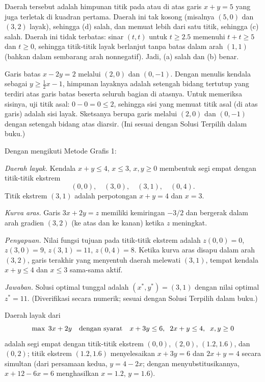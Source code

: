 Daerah tersebut adalah himpunan titik pada atau di atas garis $x + y = 5$ yang juga terletak di kuadran pertama. Daerah ini tak kosong (misalnya $(5,0)$ dan $(3,2)$ layak), sehingga (d) salah, dan memuat lebih dari satu titik, sehingga (c) salah. Daerah ini tidak terbatas: sinar $(t,t)$ untuk $t \geq 2.5$ memenuhi $t + t \geq 5$ dan $t \geq 0$, sehingga titik-titik layak berlanjut tanpa batas dalam arah $(1,1)$ (bahkan dalam sembarang arah nonnegatif). Jadi, (a) salah dan (b) benar.

Garis batas $x - 2y = 2$ melalui $(2,0)$ dan $(0,-1)$. Dengan menulis kendala sebagai $y \geq \tfrac{1}{2}x - 1$, himpunan layaknya adalah setengah bidang tertutup yang terdiri atas garis batas beserta seluruh bagian di atasnya. Untuk memeriksa sisinya, uji titik asal: $0 - 0 = 0 \leq 2$, sehingga sisi yang memuat titik asal (di atas garis) adalah sisi layak. Sketsanya berupa garis melalui $(2,0)$ dan $(0,-1)$ dengan setengah bidang atas diarsir. (Ini sesuai dengan Solusi Terpilih dalam buku.)

Dengan mengikuti Metode Grafis 1:

\emph{Daerah layak.} Kendala $x+y \leq 4$, $x \leq 3$, $x,y \geq 0$ membentuk segi empat dengan titik-titik ekstrem
\[
(0,0), \quad (3,0), \quad (3,1), \quad (0,4).
\]
Titik ekstrem $(3,1)$ adalah perpotongan $x + y = 4$ dan $x = 3$.

\emph{Kurva aras.} Garis $3x + 2y = z$ memiliki kemiringan $-3/2$ dan bergerak dalam arah gradien $(3,2)$ (ke atas dan ke kanan) ketika $z$ meningkat.

\emph{Penyapuan.} Nilai fungsi tujuan pada titik-titik ekstrem adalah $z(0,0)=0$, $z(3,0)=9$, $z(3,1)=11$, $z(0,4)=8$. Ketika kurva aras disapu dalam arah $(3,2)$, garis terakhir yang menyentuh daerah melewati $(3,1)$, tempat kendala $x+y \leq 4$ dan $x \leq 3$ sama-sama aktif.

\emph{Jawaban.} Solusi optimal tunggal adalah $(x^*,y^*) = (3,1)$ dengan nilai optimal $z^* = 11$. (Diverifikasi secara numerik; sesuai dengan Solusi Terpilih dalam buku.)

Daerah layak dari
\[
\max\; 3x + 2y \quad \mbox{dengan syarat}\quad x + 3y \leq 6, \;\; 2x + y \leq 4, \;\; x, y \geq 0
\]
adalah segi empat dengan titik-titik ekstrem $(0,0)$, $(2,0)$, $(1.2, 1.6)$, dan $(0,2)$; titik ekstrem $(1.2,1.6)$ menyelesaikan $x + 3y = 6$ dan $2x + y = 4$ secara simultan (dari persamaan kedua, $y = 4 - 2x$; dengan menyubstitusikannya, $x + 12 - 6x = 6$ menghasilkan $x = 1.2$, $y = 1.6$).

